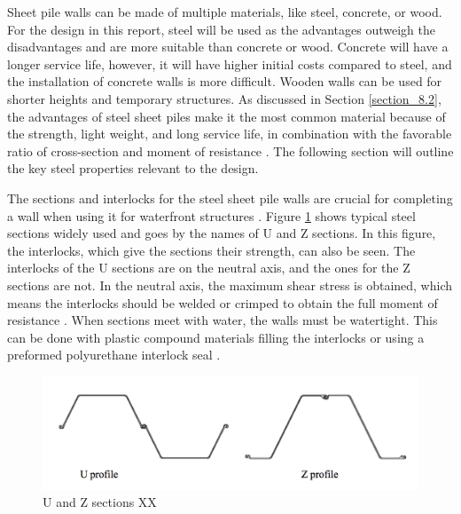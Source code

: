 

Sheet pile walls can be made of multiple materials, like steel, concrete, or wood. For the design in this report, steel will be used as the advantages outweigh the disadvantages and are more suitable than concrete or wood. Concrete will have a longer service life, however, it will have higher initial costs compared to steel, and the installation of concrete walls is more difficult. Wooden walls can be used for shorter heights and temporary structures.  As discussed in Section \ref{section_8.2}, the advantages of steel sheet piles make it the most common material because of the strength, light weight, and long service life, in combination with the favorable ratio of cross-section and moment of resistance \autocite{brownDesignSheetPile1994}. The following section will outline the key steel properties relevant to the design.


The sections and interlocks for the steel sheet pile walls are crucial for completing a wall when  using it for waterfront structures \autocite{baxterPilingHandbook2022}. Figure \ref{fig:sections_sheetpiles} shows typical steel sections widely used and goes by the names of U and Z sections. In this figure, the interlocks, which give the sections their strength, can also be seen. The interlocks of the U sections are on the neutral axis, and the ones for the Z sections are not. In the neutral axis, the maximum shear stress is obtained, which means the interlocks should be welded or crimped to obtain the full moment of resistance \autocite{kellyMechanicsLectureNotes}. When sections meet with water, the walls must be watertight. This can be done with plastic compound materials filling the interlocks or using a preformed polyurethane interlock seal \autocite{baxterPilingHandbook2022}. 


\begin{figure}[H]
    \centering
    \includegraphics[width=0.50\linewidth]{figures/ch8/u_profile_z_profile.png}
    \caption{U and Z sections XX}
    \label{fig:sections_sheetpiles}
\end{figure}

